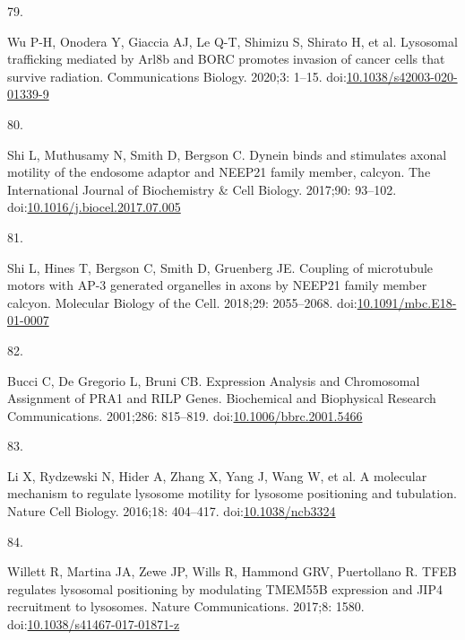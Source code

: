 \documentclass[
  12pt,
  a4paper,
]{book}
\newlength{\cslhangindent}
\newlength{\csllabelwidth}
\newlength{\cslentryspacingunit} %
\newenvironment{CSLReferences}[2] %
 {%
  \setlength{\parindent}{0pt}
  \ifodd #1
  \let\oldpar\par
  \def\par{\hangindent=\cslhangindent\oldpar}
  \fi
  \setlength{\parskip}{#2\cslentryspacingunit}
 }%
 {}
\newcommand{\CSLLeftMargin}[1]{\parbox[t]{\csllabelwidth}{#1}}
\newcommand{\CSLRightInline}[1]{\parbox[t]{\linewidth - \csllabelwidth}{#1}\break}
\begin{document}
\begin{CSLReferences}{0}{0}
\leavevmode{}%
\CSLLeftMargin{79. }%
\CSLRightInline{Wu P-H, Onodera Y, Giaccia AJ, Le Q-T, Shimizu S, Shirato H, et al. Lysosomal trafficking mediated by {Arl8b} and {BORC} promotes invasion of cancer cells that survive radiation. Communications Biology. 2020;3: 1--15. doi:\href{https://doi.org/10.1038/s42003-020-01339-9}{10.1038/s42003-020-01339-9}}

\leavevmode{}%
\CSLLeftMargin{80. }%
\CSLRightInline{Shi L, Muthusamy N, Smith D, Bergson C. Dynein binds and stimulates axonal motility of the endosome adaptor and {NEEP21} family member, calcyon. The International Journal of Biochemistry \& Cell Biology. 2017;90: 93--102. doi:\href{https://doi.org/10.1016/j.biocel.2017.07.005}{10.1016/j.biocel.2017.07.005}}

\leavevmode{}%
\CSLLeftMargin{81. }%
\CSLRightInline{Shi L, Hines T, Bergson C, Smith D, Gruenberg JE. Coupling of microtubule motors with {AP-3} generated organelles in axons by {NEEP21} family member calcyon. Molecular Biology of the Cell. 2018;29: 2055--2068. doi:\href{https://doi.org/10.1091/mbc.E18-01-0007}{10.1091/mbc.E18-01-0007}}

\leavevmode{}%
\CSLLeftMargin{82. }%
\CSLRightInline{Bucci C, De Gregorio L, Bruni CB. Expression {Analysis} and {Chromosomal Assignment} of {PRA1} and {RILP Genes}. Biochemical and Biophysical Research Communications. 2001;286: 815--819. doi:\href{https://doi.org/10.1006/bbrc.2001.5466}{10.1006/bbrc.2001.5466}}

\leavevmode{}%
\CSLLeftMargin{83. }%
\CSLRightInline{Li X, Rydzewski N, Hider A, Zhang X, Yang J, Wang W, et al. A molecular mechanism to regulate lysosome motility for lysosome positioning and tubulation. Nature Cell Biology. 2016;18: 404--417. doi:\href{https://doi.org/10.1038/ncb3324}{10.1038/ncb3324}}

\leavevmode{}%
\CSLLeftMargin{84. }%
\CSLRightInline{Willett R, Martina JA, Zewe JP, Wills R, Hammond GRV, Puertollano R. {TFEB} regulates lysosomal positioning by modulating {TMEM55B} expression and {JIP4} recruitment to lysosomes. Nature Communications. 2017;8: 1580. doi:\href{https://doi.org/10.1038/s41467-017-01871-z}{10.1038/s41467-017-01871-z}}


\end{CSLReferences}
\end{document}
